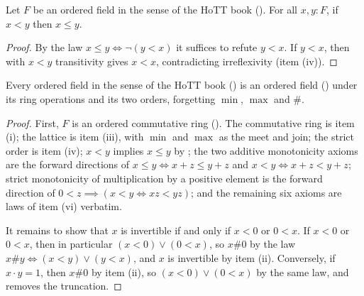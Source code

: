 \begin{lemma}
  \label{ltWeakenLeBook}
  Let $F$ be an ordered field in the sense of the HoTT book (). For all $x, y : F$, if $x < y$ then $x \le y$.
\end{lemma}
\begin{proof}
  By the law $x \le y \iff \neg(y < x)$ it suffices to refute $y < x$. If $y < x$, then with $x < y$ transitivity gives $x < x$, contradicting irreflexivity (item (iv)).
\end{proof}

\begin{theorem}
  \label{IsOrderedFieldBookToIsOrderedField}
  Every ordered field in the sense of the HoTT book () is an ordered field () under its ring operations and its two orders, forgetting $\min$, $\max$ and $\#$.
\end{theorem}
\begin{proof}
  First, $F$ is an ordered commutative ring (). The commutative ring is item (i); the lattice is item (iii), with $\min$ and $\max$ as the meet and join; the strict order is item (iv); $x < y$ implies $x \le y$ by ; the two additive monotonicity axioms are the forward directions of $x \le y \iff x + z \le y + z$ and $x < y \iff x + z < y + z$; strict monotonicity of multiplication by a positive element is the forward direction of $0 < z \implies (x < y \iff xz < yz)$; and the remaining six axioms are laws of item (vi) verbatim.

  It remains to show that $x$ is invertible if and only if $x < 0$ or $0 < x$. If $x < 0$ or $0 < x$, then in particular $(x < 0) \lor (0 < x)$, so $x \# 0$ by the law $x \# y \iff (x < y) \lor (y < x)$, and $x$ is invertible by item (ii). Conversely, if $x \cdot y = 1$, then $x \# 0$ by item (ii), so $(x < 0) \lor (0 < x)$ by the same law, and  removes the truncation.
\end{proof}
